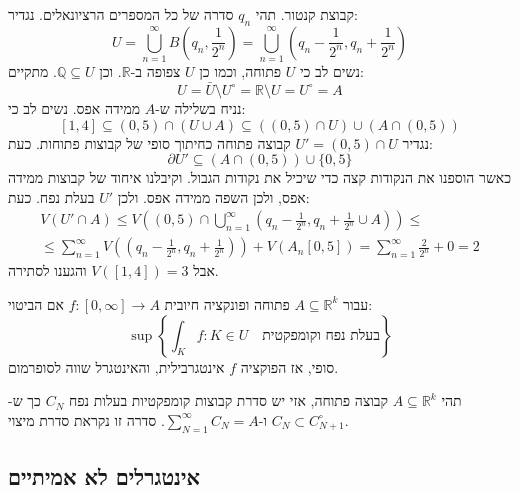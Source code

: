 \documentclass{tstextbook}
\begin{document}
\begin{example}
קבוצת קנטור. תהי \(q_{n}\) סדרה של כל המספרים הרציונאלים. נגדיר:
$$U=\bigcup_{n=1}^\infty B\left( q_{n}, \frac{1}{2^n} \right)= \bigcup_{n=1}^\infty \left( q_{n}- \frac{1}{2^n},q_{n}+\frac{1}{2^n} \right)$$
נשים לב כי \(U\) פתוחה, וכמו כן \(U\) צפופה ב-\(\mathbb{R}\). וכן \(\mathbb{Q}\subseteq U\). מתקיים:
$$U=\bar{U}\setminus  U^\circ  = \mathbb{R} \setminus U= U^\circ =A $$
נניח בשלילה ש-\(A\) ממידה אפס. נשים לב כי:
$$[1,4]\subseteq(0,5)\cap\left( U\cup A \right) \subseteq\left( (0,5)\cap U \right)\cup \left( A\cap (0,5)\right)$$
נגדיר \(U'=(0,5)\cap U\) קבוצה פתוחה כחיתוך סופי של קבוצות פתוחות. כעת:
$$\partial U' \subseteq \left( A \cap(0,5) \right)\cup \{ 0,5 \}$$
כאשר הוספנו את הנקודות קצה כדי שיכיל את נקודות הגבול. וקיבלנו איחוד של קבוצות ממידה אפס, ולכן השפה ממידה אפס. ולכן \(U'\) בעלת נפח. כעת:
$$\begin{gather} V\left( U'\cap A \right)\leq V\left( (0,5)\cap \bigcup_{n=1}^\infty\left( q_{n}-\frac{1}{2^n},q_{n}+\frac{1}{2^n}\cup A \right) \right)\leq  \\
\leq \sum_{n=1}^\infty V\left( \left( q_{n}-\frac{1}{2^n},q_{n}+\frac{1}{2^n} \right) \right) +V(A_{n}[0,5])=\sum_{n=1}^\infty \frac{2}{2^n}+0=2\end{gather}$$
אבל \(V([1,4])=3\) והגענו לסתירה.

\end{example}
\begin{proposition}
עבור \(A\subseteq \mathbb{R}^k\) פתוחה ופונקציה חיובית \(f:\left[ 0,\infty \right]\to A\) אם הביטוי:
$$\operatorname*{sup}\left\lbrace\int_{K}f:K\in U\quad {\text{בעלת נפח וקומפקטית}}\right\rbrace$$
סופי, אז הפוקציה \(f\) אינטגרבילית, והאינטגרל שווה לסופרמום. 

\end{proposition}
\begin{proposition}
תהי \(A\subseteq \mathbb{R}^k\) קבוצה פתוחה, אזי יש סדרת קבוצות קומפקטיות בעלות נפח \(C_{N}\) כך ש-\(C_{N}\subset C^\circ_{N+1}\) ו-\(\sum_{N=1}^\infty C_{N}=A\). סדרה זו נקראת סדרת מיצוי.

\end{proposition}
\subsection{אינטגרלים לא אמיתיים}
\end{document}
